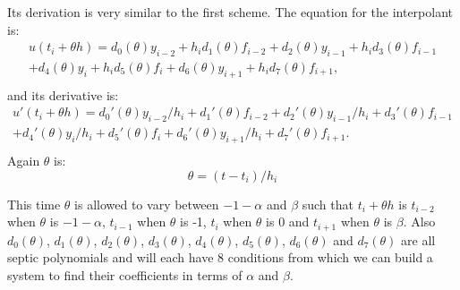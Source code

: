 \documentclass{article}
\begin{document}
Its derivation is very similar to the first scheme. The equation for the interpolant is:
\begin{equation}
\begin{split}
u(t_i + \theta h) = d_{0}(\theta)y_{i-2} +  h_id_{1}(\theta)f_{i-2} 
+ d_{2}(\theta)y_{i-1}     +  h_id_{3}(\theta)f_{i-1} \\
+ d_{4}(\theta)y_i     +  h_id_{5}(\theta)f_i 
+ d_{6}(\theta)y_{i + 1} + h_id_{7}(\theta)f_{i + 1}, \\
\end{split}
\end{equation}
and its derivative is:
\begin{equation}
\begin{split}
u'(t_i + \theta h) = d_{0}'(\theta)y_{i-2}/h_i +  d_{1}'(\theta)f_{i-2}
+ d_{2}'(\theta)y_{i-1}/h_i   +  d_{3}'(\theta)f_{i-1} \\
+ d_{4}'(\theta)y_i/h_i       +  d_{5}'(\theta)f_i
+ d_{6}'(\theta)y_{i + 1}/h_i +  d_{7}'(\theta)f_{i + 1}. \\
\end{split}
\end{equation}
Again $\theta$ is:
\begin{equation}
\theta = (t - t_i) / h_i
\end{equation}

This time $\theta$ is allowed to vary between $-1-\alpha$ and $\beta$ such that $t_i + \theta h$ is $t_{i-2}$ when $\theta$ is $-1-\alpha$, $t_{i-1}$ when $\theta$ is -1, $t_i$ when $\theta$ is 0 and $t_{i + 1}$ when $\theta$ is $\beta$. Also $d_0(\theta)$, $d_1(\theta)$, $d_2(\theta)$, $d_3(\theta)$, $d_4(\theta)$, $d_5(\theta)$, $d_6(\theta)$ and $d_7(\theta)$ are all septic polynomials and will each have 8 conditions from which we can build a system to find their coefficients in terms of $\alpha$ and $\beta$.
\end{document}
